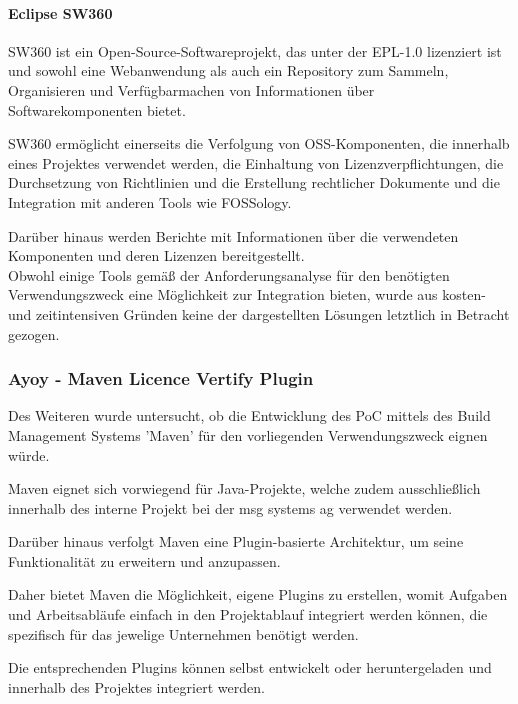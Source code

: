 \paragraph{Eclipse SW360}

SW360 ist ein Open-Source-Softwareprojekt, das unter der EPL-1.0 lizenziert ist und sowohl eine Webanwendung als auch ein Repository zum Sammeln, Organisieren und Verfügbarmachen von Informationen über Softwarekomponenten bietet. \cite{the_eclipse_foundation_sw360_2018} 

SW360 ermöglicht einerseits die Verfolgung von OSS-Komponenten, die innerhalb eines Projektes verwendet werden, die Einhaltung von Lizenzverpflichtungen, die Durchsetzung von Richtlinien und die Erstellung rechtlicher Dokumente und die Integration mit anderen Tools wie FOSSology. 

Darüber hinaus werden Berichte mit Informationen über die verwendeten Komponenten und deren Lizenzen bereitgestellt.\\

Obwohl einige Tools gemäß der Anforderungsanalyse für den benötigten Verwendungszweck eine Möglichkeit zur Integration bieten, wurde aus kosten- und zeitintensiven Gründen keine der dargestellten Lösungen letztlich in Betracht gezogen.   

\subsubsection{Ayoy - Maven Licence Vertify Plugin}

Des Weiteren wurde untersucht, ob die Entwicklung des PoC mittels des Build Management Systems 'Maven' für den vorliegenden Verwendungszweck eignen würde. 

Maven eignet sich vorwiegend für Java-Projekte, welche zudem ausschließlich innerhalb des interne Projekt bei der msg systems ag verwendet werden.  

Darüber hinaus verfolgt Maven eine Plugin-basierte Architektur, um seine Funktionalität zu erweitern und anzupassen. \cite[S. 28]{spiller_maven_2011} 

Daher bietet Maven die Möglichkeit, eigene Plugins zu erstellen, womit Aufgaben und Arbeitsabläufe einfach in den Projektablauf integriert werden können, die spezifisch für das jewelige Unternehmen benötigt werden. \cite[S. 3]{varanasi_introducing_2019}

Die entsprechenden Plugins können selbst entwickelt oder heruntergeladen und innerhalb des Projektes integriert werden.  


